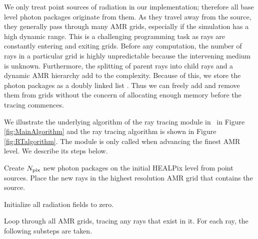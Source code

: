 \documentclass[useAMS,usenatbib]{mn2e}
\begin{document}
We only treat point sources of radiation in our implementation;
therefore all base level photon packages originate from them.  As they
travel away from the source, they generally pass through many AMR
grids, especially if the simulation has a high dynamic range.  This is
a challenging programming task as rays are constantly entering and
exiting grids.  Before any computation, the number of rays in a
particular grid is highly unpredictable because the intervening medium
is unknown.  Furthermore, the splitting of parent rays into child rays
and a dynamic AMR hierarchy add to the complexity.  Because of this,
we store the photon packages as a doubly linked list
\citep{Abel02_RT}.  Thus we can freely add and remove them from grids
without the concern of allocating enough memory before the tracing
commences.

\begin{figure*}
  \caption{\label{fig:MainAlgorithm} Flow chart for the overall
    algorithm of the radiative transfer module in \enzo~that
    illustrates (1) the creation of photon packages, (2) ray tracing,
    (3) the transport of photon packages between AMR grids, and (4)
    coupling with the hydrodynamics.  The ray tracing algorithm, which
    is contained in the ``Trace Rays'' is detailed in Figure
    \ref{fig:RTalgorithm}.}
\end{figure*}

\begin{figure*}
  \caption{\label{fig:RTalgorithm} Flow chart for the ray tracing
    algorithm for one photon passing through a grid.  Note that only
    one step is needed in the routine to adaptively split rays.  The
    remainder is a typical ray tracing method.}
\end{figure*}

We illustrate the underlying algorithm of the ray tracing module in
\enzo~in Figure \ref{fig:MainAlgorithm} and the ray tracing algorithm
is shown in Figure \ref{fig:RTalgorithm}.  The module is only called
when advancing the finest AMR level.  We describe its steps below.

 Create $N_{\rm pix}$ new photon packages on the initial
HEALPix level from point sources.  Place the new rays in the highest
resolution AMR grid that contains the source.

 Initialize all radiation fields to zero.

 Loop through all AMR grids, tracing any rays that exist in
it.  For each ray, the following substeps are taken.
\end{document}
